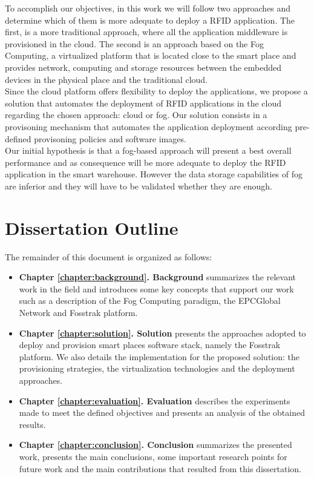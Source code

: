 To accomplish our objectives, in this work we will follow two approaches and determine which of them
is more adequate to deploy a \gls{RFID} application. The first, is a more traditional approach, where
all the application middleware is provisioned in the cloud. The second is an approach based on the Fog
Computing\cite{bonomi2012fog}, a virtualized platform that is located close to the smart place and
provides network, computing and storage resources between the embedded devices in the physical place
and the traditional cloud.\\

Since the cloud platform offers flexibility to deploy the applications, we propose a solution that
automates the deployment of \gls{RFID} applications in the cloud regarding the chosen approach:
cloud or fog. Our solution consists in a provisoning mechanism that automates the application
deployment according pre-defined provisoning policies and software images.\\

Our initial hypothesis is that a fog-based approach will present a best overall performance and as
consequence will be more adequate to deploy the \gls{RFID} application in the smart warehouse. However
the data storage capabilities of fog are inferior and they will have to be validated whether they are
enough.

\section{Dissertation Outline}
\label{section:outline}
The remainder of this document is organized as follows:
\begin{itemize}
  \item \textbf{Chapter \ref{chapter:background}. Background} summarizes the relevant work in the field and
  introduces some key concepts that support our work such as a description of the Fog Computing paradigm,
  the EPCGlobal Network and Fosstrak platform.
  \item \textbf{Chapter \ref{chapter:solution}. Solution} presents the approaches adopted to deploy
  and provision smart places software stack, namely the Fosstrak platform. We also details the implementation
  for the proposed solution: the provisioning strategies, the virtualization technologies and the
  deployment approaches.
  \item \textbf{Chapter \ref{chapter:evaluation}. Evaluation} describes the experiments made to meet
  the defined objectives and presents an analysis of the obtained results.
  \item \textbf{Chapter \ref{chapter:conclusion}. Conclusion} summarizes the presented work,
  presents the main conclusions, some important research points for future work and the main contributions
  that resulted from this dissertation.
\end{itemize}

